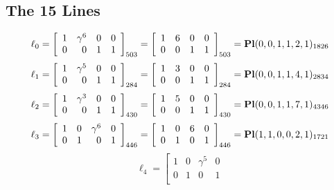 \documentclass{article}
\begin{document}
{\subsection*{The 15 Lines}
$$
\ell_{0} = 
\left[
\begin{array}{*{4}{r}}
1 & \gamma^{6} & 0 & 0\\
0 & 0 & 1 & 1\\
\end{array}
\right]
_{503}
=
\left[
\begin{array}{*{4}c}
1  & 6  & 0  & 0\\
0  & 0  & 1  & 1\\
\end{array}
\right]_{503}
={\rm\bf Pl}(0,0,1,1,2,1 )_{1826}$$
$$
\ell_{1} = 
\left[
\begin{array}{*{4}{r}}
1 & \gamma^{5} & 0 & 0\\
0 & 0 & 1 & 1\\
\end{array}
\right]
_{284}
=
\left[
\begin{array}{*{4}c}
1  & 3  & 0  & 0\\
0  & 0  & 1  & 1\\
\end{array}
\right]_{284}
={\rm\bf Pl}(0,0,1,1,4,1 )_{2834}$$
$$
\ell_{2} = 
\left[
\begin{array}{*{4}{r}}
1 & \gamma^{3} & 0 & 0\\
0 & 0 & 1 & 1\\
\end{array}
\right]
_{430}
=
\left[
\begin{array}{*{4}c}
1  & 5  & 0  & 0\\
0  & 0  & 1  & 1\\
\end{array}
\right]_{430}
={\rm\bf Pl}(0,0,1,1,7,1 )_{4346}$$
$$
\ell_{3} = 
\left[
\begin{array}{*{4}{r}}
1 & 0 & \gamma^{6} & 0\\
0 & 1 & 0 & 1\\
\end{array}
\right]
_{446}
=
\left[
\begin{array}{*{4}c}
1  & 0  & 6  & 0\\
0  & 1  & 0  & 1\\
\end{array}
\right]_{446}
={\rm\bf Pl}(1,1,0,0,2,1 )_{1721}$$
$$
\ell_{4} = 
\left[
\begin{array}{*{4}{r}}
1 & 0 & \gamma^{5} & 0\\
0 & 1 & 0 & 1\\

\end{array}$$}
\end{document}
